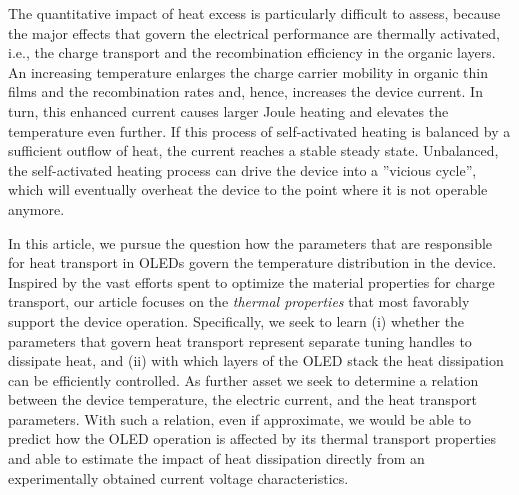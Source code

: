 \documentclass[%
9pt,
 aip,
rsi,%
 amsmath,amssymb,
preprint,%
]{revtex4-1}
\begin{document}
The quantitative impact of heat excess is particularly difficult to assess, because the major effects that govern the electrical performance are thermally activated, i.e., the charge transport and the recombination efficiency in the organic layers. 
An increasing temperature enlarges the charge carrier mobility in organic thin films\cite{Bassler1993} and the recombination rates and, hence, increases the device current. In turn, this enhanced current causes larger Joule heating and elevates the temperature even further.
If this process of self-activated heating is balanced by a sufficient outflow of heat, the current reaches a stable steady state. 
Unbalanced, the self-activated heating process can drive the device into a ''vicious cycle'', which will eventually overheat the device to the point where it is not operable anymore.



In this article, we pursue the question how the parameters that are responsible for heat transport in OLEDs govern the temperature distribution in the device.
Inspired by the vast efforts spent to optimize the material properties for charge transport, our article focuses on the \textit{thermal properties} that most favorably support the device operation. 
Specifically, we seek to learn (i) whether the parameters that govern heat transport represent separate tuning handles to dissipate heat, and (ii) with which layers of the OLED stack the heat dissipation can be efficiently controlled.
As further asset we seek to determine a relation between the device temperature, the electric current, and the heat transport parameters.
With such a relation, even if approximate, we would be able to predict how the OLED operation is affected by its thermal transport properties and able to estimate the impact of heat dissipation directly from an experimentally obtained current voltage characteristics.
\end{document}

